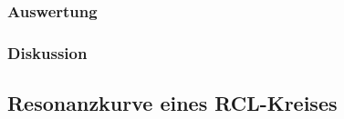 \documentclass[12pt,a4paper]{article}
\begin{document}
\subsubsection{Auswertung}
\subsubsection{Diskussion}


\subsection{Resonanzkurve eines RCL-Kreises}
\end{document}
